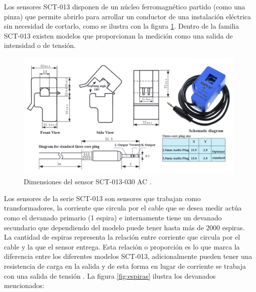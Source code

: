 Los sensores SCT-013 disponen de un núcleo ferromagnético partido (como una pinza) que permite abrirlo para arrollar un conductor de una instalación eléctrica sin necesidad de cortarlo, como se ilustra con la figura \ref{fig:sensorCorriente}. Dentro de la familia SCT-013 existen modelos que proporcionan la medición como una salida de intensidad o de tensión. 


\begin{figure}[htbp]
	\centering
	\includegraphics[width=1.0\textwidth]{./Figures/sensorCorriente2.png}
	\caption{Dimensiones del sensor SCT-013-030 AC \protect\footnotemark.}
	\label{fig:sensorCorriente}
\end{figure}



Los sensores de la serie SCT-013 son sensores que trabajan como transformadores, la corriente que circula por el cable que se desea medir actúa como el devanado primario (1 espira) e internamente tiene un devanado secundario que dependiendo del modelo puede tener hasta más de 2000 espiras. La cantidad de espiras representa la relación entre corriente que circula por el cable y la que el sensor entrega. Esta relación o proporción es lo que marca la diferencia entre los diferentes modelos SCT-013, adicionalmente pueden tener una resistencia de carga en la salida y de esta forma en lugar de corriente se trabaja con una salida de tensión \citep{WEBSITE:21}. La figura \ref{fig:espiras} ilustra los devanados mencionados:

